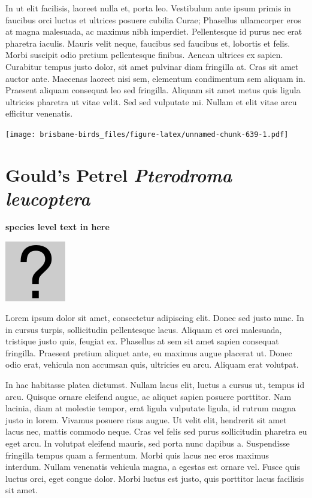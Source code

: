 \documentclass[]{book}
\let\origfigure\figure
\let\endorigfigure\endfigure
\renewenvironment{figure}[1][2] {
  \expandafter\origfigure\expandafter[H]
} {
  \endorigfigure
}
\begin{document}
In ut elit facilisis, laoreet nulla et, porta leo. Vestibulum ante ipsum
primis in faucibus orci luctus et ultrices posuere cubilia Curae;
Phasellus ullamcorper eros at magna malesuada, ac maximus nibh
imperdiet. Pellentesque id purus nec erat pharetra iaculis. Mauris velit
neque, faucibus sed faucibus et, lobortis et felis. Morbi suscipit odio
pretium pellentesque finibus. Aenean ultrices ex sapien. Curabitur
tempus justo dolor, sit amet pulvinar diam fringilla at. Cras sit amet
auctor ante. Maecenas laoreet nisi sem, elementum condimentum sem
aliquam in. Praesent aliquam consequat leo sed fringilla. Aliquam sit
amet metus quis ligula ultricies pharetra ut vitae velit. Sed sed
vulputate mi. Nullam et elit vitae arcu efficitur venenatis.

\begin{figure}
\centering
\texttt{[image: brisbane-birds\_files/figure-latex/unnamed-chunk-639-1.pdf]}
\caption{\label{fig:unnamed-chunk-639}insert figure caption}
\end{figure}

\section{\texorpdfstring{Gould's Petrel \emph{Pterodroma
leucoptera}}{Gould's Petrel Pterodroma leucoptera}}\label{goulds-petrel-pterodroma-leucoptera}

\textbf{species level text in here}

\begin{figure}
\centering
\includegraphics{assets/missing.png}
\caption{No image for species}
\end{figure}

Lorem ipsum dolor sit amet, consectetur adipiscing elit. Donec sed justo
nunc. In in cursus turpis, sollicitudin pellentesque lacus. Aliquam et
orci malesuada, tristique justo quis, feugiat ex. Phasellus at sem sit
amet sapien consequat fringilla. Praesent pretium aliquet ante, eu
maximus augue placerat ut. Donec odio erat, vehicula non accumsan quis,
ultricies eu arcu. Aliquam erat volutpat.

In hac habitasse platea dictumst. Nullam lacus elit, luctus a cursus ut,
tempus id arcu. Quisque ornare eleifend augue, ac aliquet sapien posuere
porttitor. Nam lacinia, diam at molestie tempor, erat ligula vulputate
ligula, id rutrum magna justo in lorem. Vivamus posuere risus augue. Ut
velit elit, hendrerit sit amet lacus nec, mattis commodo neque. Cras vel
felis sed purus sollicitudin pharetra eu eget arcu. In volutpat eleifend
mauris, sed porta nunc dapibus a. Suspendisse fringilla tempus quam a
fermentum. Morbi quis lacus nec eros maximus interdum. Nullam venenatis
vehicula magna, a egestas est ornare vel. Fusce quis luctus orci, eget
congue dolor. Morbi luctus est justo, quis porttitor lacus facilisis sit
amet.
\end{document}
